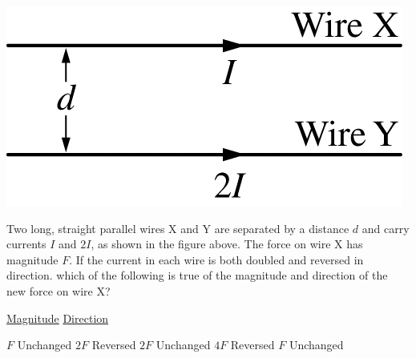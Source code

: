 
\begin{center}
    \includegraphics[scale=0.3]{images/img-009-017.png}
\end{center}

\begin{questions}
\setcounter{question}{15}
\question
Two long, straight parallel wires X and Y are separated by a distance $d$ and carry currents $I$ and $2 I$, as shown in the figure above. The force on wire X has magnitude $F$. If the current in each wire is both doubled and reversed in direction. which of the following is true of the magnitude and direction of the new force on wire X?

\tabto{0.75cm}\underline{Magnitude}
\tabto{3.00cm}\underline{Direction}

\begin{choices}
    \choice $F$   \tabto{2.25cm} Unchanged
    \choice $2 F$ \tabto{2.25cm} Reversed
    \choice $2 F$ \tabto{2.25cm} Unchanged
    \choice $4 F$ \tabto{2.25cm} Reversed
    $ F$ \tabto{2.25cm} Unchanged
\end{choices}
\end{questions}
